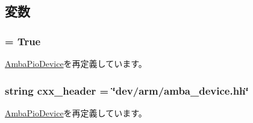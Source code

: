 \subsection{変数}
\hypertarget{classRealView_1_1AmbaIntDevice_a17fa61ac3806b481cafee5593b55e5d0}{
\subsubsection[{abstract}]{ = True}}
\label{classRealView_1_1AmbaIntDevice_a17fa61ac3806b481cafee5593b55e5d0}


\hyperlink{classRealView_1_1AmbaPioDevice_a17fa61ac3806b481cafee5593b55e5d0}{AmbaPioDevice}を再定義しています。\hypertarget{classRealView_1_1AmbaIntDevice_a17da7064bc5c518791f0c891eff05fda}{
\subsubsection[{cxx\_\-header}]{\setlength{\rightskip}{0pt plus 5cm}string {\bf cxx\_\-header} = \char`\"{}dev/arm/amba\_\-device.hh\char`\"{}}}
\label{classRealView_1_1AmbaIntDevice_a17da7064bc5c518791f0c891eff05fda}


\hyperlink{classRealView_1_1AmbaPioDevice_a17da7064bc5c518791f0c891eff05fda}{AmbaPioDevice}を再定義しています。

